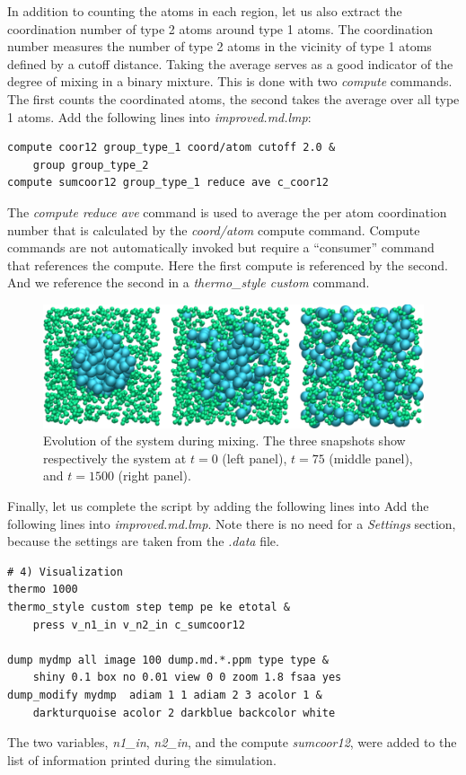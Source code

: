 \documentclass[9pt,tutorial]{livecoms}
\begin{document}
In addition to counting the atoms in each region, let us also extract
the coordination number of type 2 atoms around type 1 atoms.  The
coordination number measures the number of type 2 atoms in the vicinity
of type 1 atoms defined by a cutoff distance.  Taking the average serves
as a good indicator of the degree of mixing in a binary mixture.  This
is done with two \textit{compute} commands.  The first counts the
coordinated atoms, the second takes the average over all type 1
atoms. Add the following lines into \textit{improved.md.lmp}:
\begin{lstlisting}
compute coor12 group_type_1 coord/atom cutoff 2.0 &
    group group_type_2
compute sumcoor12 group_type_1 reduce ave c_coor12
\end{lstlisting}
The \textit{compute reduce ave} command is used to average the per atom
coordination number that is calculated by the \textit{coord/atom}
compute command.  Compute commands are not automatically invoked but
require a ``consumer'' command that references the compute.  Here the
first compute is referenced by the second.  And we reference the second
in a \textit{thermo\_style custom} command.

\begin{figure}
\centering
\includegraphics[width=\linewidth]{LJ-evolution}
\caption{Evolution of the system during mixing. The three snapshots show
respectively the system at $t=0$ (left panel), $t=75$ (middle panel), and $t=1500$
(right panel).}
\label{fig:evolution-population}
\end{figure}

Finally, let us complete the script by adding the following lines into
Add the following lines into \textit{improved.md.lmp}.  Note there is no
need for a \textit{Settings} section, because the settings are taken
from the \textit{.data} file.
\begin{lstlisting}
# 4) Visualization
thermo 1000
thermo_style custom step temp pe ke etotal &
    press v_n1_in v_n2_in c_sumcoor12

dump mydmp all image 100 dump.md.*.ppm type type &
    shiny 0.1 box no 0.01 view 0 0 zoom 1.8 fsaa yes
dump_modify mydmp  adiam 1 1 adiam 2 3 acolor 1 &
    darkturquoise acolor 2 darkblue backcolor white
\end{lstlisting}
The two variables, \textit{n1\_in}, \textit{n2\_in}, and the compute
\textit{sumcoor12}, were added to the list of information printed during
the simulation.
\end{document}
